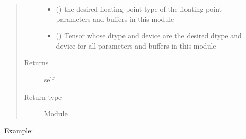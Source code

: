 \documentclass[letterpaper,10pt,english]{sphinxmanual}
\begin{document}
\begin{fulllineitems}
\begin{fulllineitems}
\begin{quote}
\begin{description}
\begin{itemize}
\item {} 
 () \textendash{} the desired floating point type of
the floating point parameters and buffers in this module

\item {} 
 () \textendash{} Tensor whose dtype and device are the desired
dtype and device for all parameters and buffers in this module

\end{itemize}

\item[{Returns}] \leavevmode
self

\item[{Return type}] \leavevmode
Module

\end{description}\end{quote}

Example:


\end{fulllineitems}
\end{fulllineitems}
\end{document}
